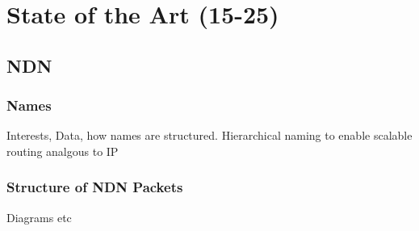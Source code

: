 \chapter{State of the Art (15-25)}



\section{NDN}

\subsection{Names}
Interests, Data, how names are structured. Hierarchical naming to enable scalable routing analgous to IP

\subsection{Structure of NDN Packets}
Diagrams etc

